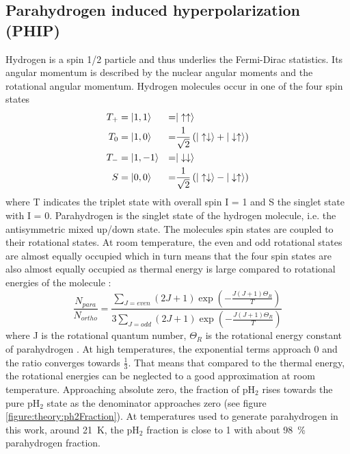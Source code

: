         \subsection{Parahydrogen induced hyperpolarization (PHIP)}
            Hydrogen is a spin 1/2 particle and thus underlies the Fermi-Dirac statistics. Its angular momentum is described by the nuclear angular moments and the rotational angular momentum. Hydrogen molecules occur in one of the four spin states
            \begin{equation}
                 \begin{aligned}
                     T_+ &=\ket{1,1} & = & |\uparrow\uparrow\rangle\\
                     T_0 &= \ket{1,0} & = &\frac{1}{\sqrt{2}}\left(|\uparrow\downarrow\rangle + |\downarrow\uparrow\rangle\right)\\
                     T_- &= \ket{1,-1}& = & |\downarrow\downarrow\rangle\\
                     S &= \ket{0,0} & = &\frac{1}{\sqrt{2}}\left(|\uparrow\downarrow\rangle - |\downarrow\uparrow\rangle\right)
                 \end{aligned}
            \end{equation}
            where T indicates the triplet state with overall spin I = 1 and S the singlet state with I = 0. Parahydrogen is the singlet state of the hydrogen molecule, i.e. the antisymmetric mixed up/down state. The molecules spin states are coupled to their rotational states. At room temperature, the even and odd rotational states are almost equally occupied which in turn means that the four spin states are also almost equally occupied as thermal energy is large compared to rotational energies of the molecule \cite{green_theory_2012-1}:
            \begin{equation}
                \frac{N_{para}}{N_{ortho}} = \frac{\sum_{J=even}(2J+1)\exp\left(-\frac{J(J+1)\Theta_R}{T}\right)}{3\sum_{J=odd}\left(2J+1\right)\exp\left(-\frac{J(J+1)\Theta_R}{T}\right)}
            \end{equation}
            where J is the rotational quantum number, $\Theta_R$ is the rotational energy constant of parahydrogen \cite{noauthor_orthohydrogen_1935}. At high temperatures, the exponential terms approach 0 and the ratio converges towards $\tfrac{1}{3}$. That means that compared to the thermal energy, the rotational energies can be neglected to a good approximation at room temperature. Approaching absolute zero, the fraction of pH$_2$ rises towards the pure pH$_2$ state as the denominator approaches zero (see figure \ref{figure:theory:ph2Fraction}). At temperatures used to generate parahydrogen in this work, around \SI{21}{\kelvin}, the pH$_2$ fraction is close to 1 with about \SI{98}{\percent} parahydrogen fraction.
